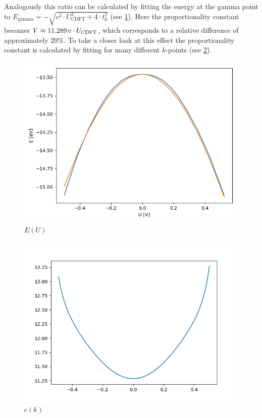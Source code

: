 Analogously this ratio can be calculated by fitting the energy at the gamma point to \linebreak $E_\text{gamma} = -\sqrt{c^2 \cdot U_\text{CDFT}^2 + 4 \cdot t_0^2}$ (see \cref{image_hydrogen_mid_energy_potential}). Here the proportionality constant becomes $V \approx \unit[11.289]{e} \cdot U_\text{CDFT}$, which corresponds to a relative difference of approximately 20\%. To take a closer look at this effect the proportionality constant is calculated by fitting for many different $k$-points (see \cref{image_hydrogen_proportionality_constant}). 
\begin{figure}
	\centering
	\includegraphics[width = 12cm]{Images/Hydrogen/hydrogen_mid_energy}
	\caption{$E(U)$}
	\label{image_hydrogen_mid_energy_potential}
\end{figure}

\begin{figure}
	\centering
	\includegraphics[width = 12cm]{Images/Hydrogen/hydrogen_c_k_dependency}
	\caption{$c(k)$}
	\label{image_hydrogen_proportionality_constant}
\end{figure}